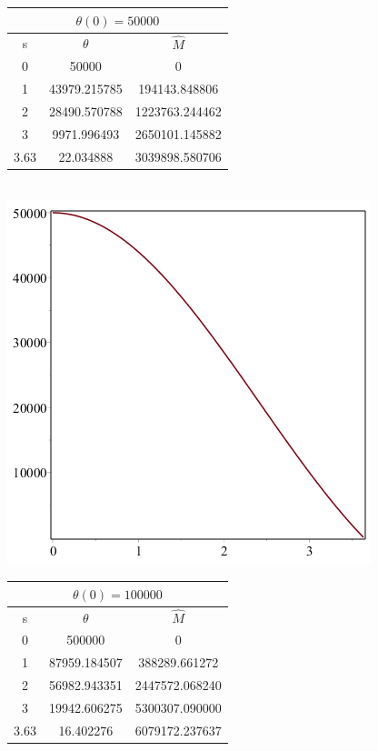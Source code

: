 \documentclass[11pt]{article} %
\begin{document}
\begin{tabular}{ | c c c |}
\multicolumn{3}{c}{ $\theta(0) = 50000$ } \\
\hline
s & $\theta$ & $\hat M$\\
\hline
0 & 50000 & 0\\
1 &43979.215785&194143.848806\\
2 &28490.570788&1223763.244462\\
3 & 9971.996493& 2650101.145882\\
3.63 &22.034888 &3039898.580706\\
\hline
\end{tabular}\\
\includegraphics[scale=.5]{plots/wd7.png}\\
\begin{tabular}{ | c c c |}
\multicolumn{3}{c}{ $\theta(0) = 100000$ } \\
\hline
s & $\theta$ & $\hat M$\\
\hline
0 & 500000 & 0\\
1 &87959.184507&388289.661272\\
2 &56982.943351&2447572.068240\\
3 & 19942.606275& 5300307.090000\\
3.63 &16.402276 &6079172.237637\\
\hline
\end{tabular}\\
\end{document}
